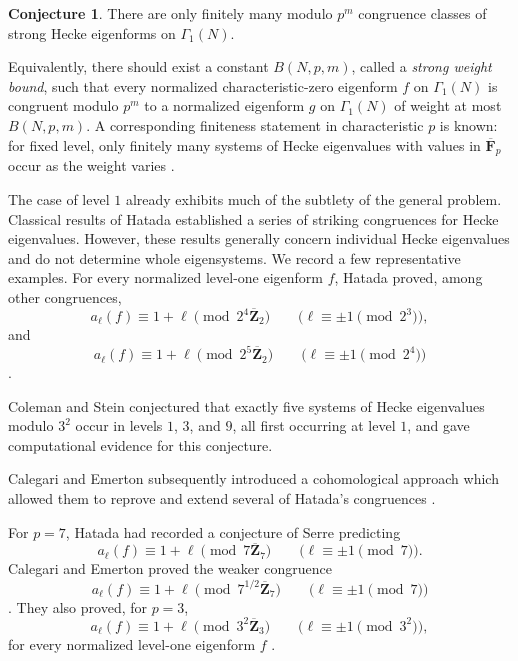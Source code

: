 \documentclass[11pt]{article}
\theoremstyle{plain}
\theoremstyle{definition}
\newtheorem{conjecture}[theorem]{Conjecture}
\theoremstyle{remark}
\numberwithin{equation}{section}
\begin{document}
\begin{conjecture} \label{conj:krw-finiteness} There are only finitely many modulo \(p^m\) congruence classes of strong Hecke eigenforms on \(\Gamma_1(N)\). \end{conjecture}

Equivalently, there should exist a constant \(B(N,p,m) \), called a \emph{strong weight
bound}, such that every normalized characteristic-zero eigenform \(f\) on \(\Gamma_1(N)\) is congruent modulo \(p^m\) to a normalized eigenform \(g\) on \(\Gamma_1(N)\) of weight at most \(B(N,p,m)\). A corresponding finiteness statement in characteristic \(p\) is known: for fixed level, only finitely many systems of Hecke eigenvalues with values in \(\overline{\mathbf F}_p\) occur as the weight varies \cite{Jochnowitz1982}. 

The case of level \(1\) already exhibits much of the subtlety of the general problem. Classical results of Hatada \cite{Hatada1977a,Hatada1977b,Hatada1979,Hatada1981} established a series of striking congruences for Hecke eigenvalues. However, these results generally concern individual Hecke eigenvalues and do not determine whole eigensystems. We record a few representative examples. For every normalized level-one eigenform \(f\), Hatada proved, among other congruences, \[ a_\ell(f)\equiv 1+\ell \pmod{2^4\overline{\mathbf Z}_2} \qquad \bigl(\ell\equiv\pm1\pmod{2^3}\bigr), \] and \[ a_\ell(f)\equiv 1+\ell \pmod{2^5\overline{\mathbf Z}_2} \qquad \bigl(\ell\equiv\pm1\pmod{2^4}\bigr) \] \cite{Hatada1979,Hatada1981}. 

Coleman and Stein \cite[Conjecture~3.4]{ColemanStein2004} conjectured that exactly five systems of Hecke eigenvalues modulo \(3^2\) occur in levels \(1\), \(3\), and \(9\), all first occurring at level \(1\), and gave computational evidence for this conjecture. 

Calegari and Emerton subsequently introduced a cohomological approach which allowed them to reprove and extend several of Hatada's congruences \cite[Theorem~2.2 and Lemmas~3.1--3.3]{CalegariEmerton2004}. 

For \(p=7\), Hatada had recorded a conjecture of Serre predicting \begin{equation}\label{conj:serre-conjecture} a_\ell(f)\equiv1+\ell \pmod{7\overline{\mathbf Z}_7} \qquad \bigl(\ell\equiv\pm1\pmod7\bigr). \end{equation} Calegari and Emerton proved the weaker congruence \[ a_\ell(f)\equiv1+\ell \pmod{7^{1/2}\overline{\mathbf Z}_7} \qquad \bigl(\ell\equiv\pm1\pmod7\bigr) \] \cite[Lemma~3.2]{CalegariEmerton2004}. They also proved, for \(p=3\), \[ a_\ell(f)\equiv1+\ell \pmod{3^2\overline{\mathbf Z}_3} \qquad \bigl(\ell\equiv\pm1\pmod{3^2}\bigr), \] for every normalized level-one eigenform \(f\) \cite[Lemma~3.3]{CalegariEmerton2004}. 
\end{document}
